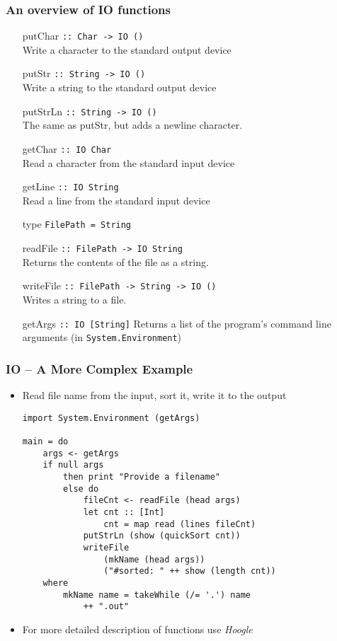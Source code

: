 \documentclass[final,handout]{beamer}
\begin{document}
\begin{frame}[fragile]
    \frametitle{An overview of IO functions}
\small
    \begin{itemize}
        \item[putChar] \texttt{:: Char -> IO ()} \\
            Write a character to the standard output device
        \item[putStr] \texttt{:: String -> IO ()} \\
            Write a string to the standard output device
        \item[putStrLn] \texttt{:: String -> IO ()} \\
            The same as putStr, but adds a newline character.
        \item[getChar] \texttt{:: IO Char} \\
            Read a character from the standard input device
        \item[getLine] \texttt{:: IO String} \\
            Read a line from the standard input device 
        \item[type] \texttt{FilePath = String}
        \item[readFile]\texttt{:: FilePath -> IO String} \\
            Returns the contents of the file as a string.

        \item[writeFile] \texttt{:: FilePath -> String -> IO ()} \\
            Writes a string to a file.

        \item[getArgs] \texttt{:: IO [String]}
            Returns a list of the program's command line arguments
            (in \texttt{System.Environment})
    \end{itemize}
\end{frame}

\begin{frame}[fragile]
    \frametitle{IO -- A More Complex Example}

    \begin{itemize}
        \item Read file name from the input, sort it, write it to the output
\small
\begin{lstlisting}
import System.Environment (getArgs)

main = do
    args <- getArgs
    if null args
        then print "Provide a filename"
        else do
            fileCnt <- readFile (head args)
            let cnt :: [Int]
                cnt = map read (lines fileCnt)
            putStrLn (show (quickSort cnt))
            writeFile
                (mkName (head args)) 
                ("#sorted: " ++ show (length cnt))
    where
        mkName name = takeWhile (/= '.') name
            ++ ".out"
\end{lstlisting}
    
        \item For more detailed description of functions use \emph{Hoogle}


    \end{itemize}
\end{frame}
\end{document}
